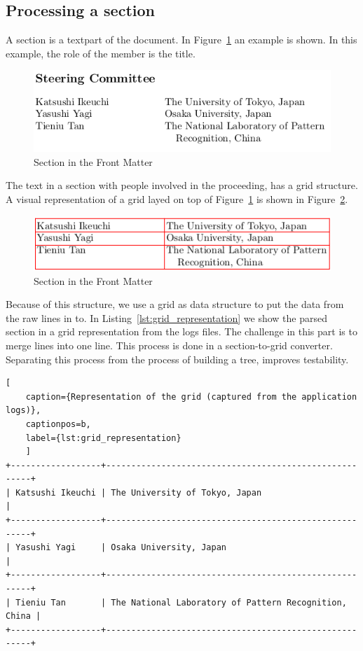 \documentclass{ou-report}
\begin{document}
\subsection{Processing a section}
A section is a textpart of the document. In 
Figure~\ref{fig:front_matter_section} an example is shown. In this example, the
role of the member is the title.
\begin{figure}[H]
    \centering
    \includegraphics[width=12cm]{images/front_matter/section.png}
    \caption{Section in the Front Matter}
    \label{fig:front_matter_section}
\end{figure}
The text in a section with people involved in the proceeding, has a grid
structure. A visual representation of a grid layed on top of 
Figure~\ref{fig:front_matter_section} is shown in 
Figure~\ref{fig:front_matter_section_grid}. 
\begin{figure}[H]
    \centering
    \includegraphics[width=12cm]{images/front_matter/section_table.png}
    \caption{Section in the Front Matter}
    \label{fig:front_matter_section_grid}
\end{figure}
Because of this structure, we use a grid as data structure to put the data from 
the raw lines in to. In Listing~\ref{lst:grid_representation} we show the 
parsed section in a grid representation from the logs files. 
 The challenge in this part is to merge lines into one line.
This process is done in a section-to-grid converter. Separating this
process from the process of building a tree, improves testability.

\begin{lstlisting}[
    caption={Representation of the grid (captured from the application logs)},
    captionpos=b,
    label={lst:grid_representation}
    ]
+------------------+-------------------------------------------------------+
| Katsushi Ikeuchi | The University of Tokyo, Japan                        |
+------------------+-------------------------------------------------------+
| Yasushi Yagi     | Osaka University, Japan                               |
+------------------+-------------------------------------------------------+
| Tieniu Tan       | The National Laboratory of Pattern Recognition, China |
+------------------+-------------------------------------------------------+
\end{lstlisting}
\end{document}
